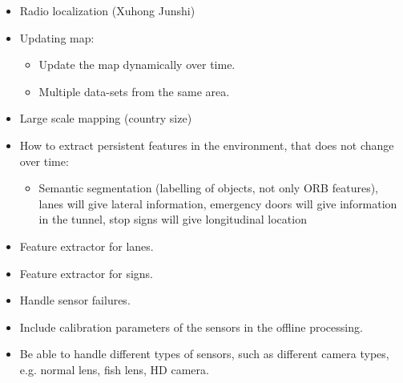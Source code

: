 \begin{itemize}
\item Radio localization  (Xuhong  Junshi)
\item Updating map:
  \begin{itemize}
  \item Update the map dynamically over time.
  \item Multiple data-sets from the same area.
  \end{itemize}
\item Large scale mapping (country size)
\item How to extract persistent features in the environment, that does
  not change over time:
  \begin{itemize}
  \item  Semantic segmentation (labelling of objects, not only ORB
    features), lanes will give lateral information, emergency doors
    will give information in the tunnel, stop signs will give
    longitudinal location
  \end{itemize}
\item Feature extractor for lanes.
\item Feature extractor for signs.
\item Handle sensor failures.
\item Include calibration parameters of the sensors in the offline processing.
\item Be able to handle different types of sensors, such as different camera types, e.g. normal lens, fish lens, HD camera.
\end{itemize}


